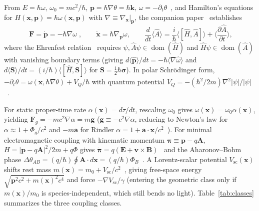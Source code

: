 \documentclass[aps,prd,onecolumn,tightenlines,nofootinbib,notitlepage,10pt,floatfix]{revtex4-2}
\theoremstyle{indentedtheorem}
\begin{document}
From $E=\hbar\omega$, $\omega_0=mc^2/\hbar$, $\mathbf{p}=\hbar\nabla\theta=\hbar\mathbf{k}$, $\omega=-\partial_t\theta$~\citep{Planck1901Radiation,Einstein1905Photoelectric,Einstein1905Inertia,deBroglie1925Thesis}, and Hamilton's equations for $H(\mathbf{x},\mathbf{p})=\hbar\omega(\mathbf{x},\mathbf{p})$ with $\nabla\equiv\nabla_{\mathbf{x}}|_{\mathbf{p}}$, the companion paper~\citep{HutchisonSGM2026} establishes
\begin{equation}
    \boxed{\;\mathbf{F} = \dot{\mathbf{p}} = -\hbar\nabla\omega\;} , \qquad \dot{\mathbf{x}} = \hbar\nabla_{\mathbf{p}}\omega , \qquad \frac{d}{dt}\langle\hat{A}\rangle = \frac{i}{\hbar}\big\langle[\hat{H},\hat{A}]\big\rangle + \Big\langle\frac{\partial\hat{A}}{\partial t}\Big\rangle ,
    \label{eq:sgm}
\end{equation}
where the Ehrenfest relation~\citep{Ehrenfest1927Bemerkung} requires $\psi,\hat{A}\psi\in\operatorname{dom}(\hat{H})$ and $\hat{H}\psi\in\operatorname{dom}(\hat{A})$ with vanishing boundary terms (giving $d\langle\hat{\mathbf{p}}\rangle/dt=-\hbar\langle\nabla\hat{\omega}\rangle$ and $d\langle\mathbf{S}\rangle/dt=(i/\hbar)\langle[\hat{H},\mathbf{S}]\rangle$ for $\mathbf{S}=\tfrac{1}{2}\hbar\boldsymbol{\sigma}$). In polar Schr\"odinger form, $-\partial_t\theta=\omega(\mathbf{x},\hbar\nabla\theta)+V_Q/\hbar$ with quantum potential $V_Q=-(\hbar^2/2m)\nabla^2|\psi|/|\psi|$~\citep{Madelung1927Quantentheorie,Bohm1952Suggested}.

For static proper-time rate $\alpha(\mathbf{x})=d\tau/dt$, rescaling $\omega_0$ gives $\omega(\mathbf{x})=\omega_0\alpha(\mathbf{x})$, yielding $\mathbf{F}_g=-mc^2\nabla\alpha=m\mathbf{g}$ ($\mathbf{g}\equiv -c^2\nabla\alpha$, reducing to Newton's law for $\alpha\approx 1+\Phi_g/c^2$ and $-m\mathbf{a}$ for Rindler $\alpha=1+\mathbf{a}\cdot\mathbf{x}/c^2$~\citep{Einstein1907Relativitatsprinzip,HehlNi1990Inertial}). For minimal electromagnetic coupling with kinematic momentum $\boldsymbol{\pi}\equiv\mathbf{p}-q\mathbf{A}$, $H=|\mathbf{p}-q\mathbf{A}|^2/2m+q\Phi$ gives $\dot{\boldsymbol{\pi}}=q(\mathbf{E}+\mathbf{v}\times\mathbf{B})$~\citep{Lorentz1895Electrodynamics,Jackson1999Classical} and the Aharonov--Bohm phase $\Delta\theta_{AB}=(q/\hbar)\oint\mathbf{A}\cdot d\mathbf{x}=(q/\hbar)\Phi_B$~\citep{Ehrenberg1949Refractive,Aharonov1959Significance}. A Lorentz-scalar potential $V_\text{sc}(\mathbf{x})$ shifts rest mass $m(\mathbf{x})=m_0+V_\text{sc}/c^2$~\citep{Walecka1974Theory,Bastard1988Wave}, giving free-space energy $\sqrt{\mathbf{p}^2 c^2+m(\mathbf{x})^2 c^4}$ and force $-\nabla V_\text{sc}/\gamma$ (entering the geometric class only if $m(\mathbf{x})/m_0$ is species-independent, which still bends no light). Table~\ref{tab:classes} summarizes the three coupling classes.
\end{document}
